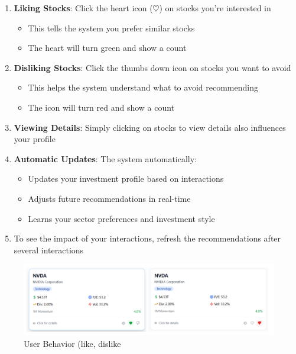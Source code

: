 \begin{enumerate}
    \item \textbf{Liking Stocks}: Click the heart icon ($\pmb{\heartsuit}$) on stocks you're interested in
    \begin{itemize}
        \item This tells the system you prefer similar stocks
        \item The heart will turn green and show a count
    \end{itemize}
    \item \textbf{Disliking Stocks}: Click the thumbs down icon on stocks you want to avoid
    \begin{itemize}
        \item This helps the system understand what to avoid recommending
        \item The icon will turn red and show a count
    \end{itemize}
    \item \textbf{Viewing Details}: Simply clicking on stocks to view details also influences your profile
    \item \textbf{Automatic Updates}: The system automatically:
    \begin{itemize}
        \item Updates your investment profile based on interactions
        \item Adjusts future recommendations in real-time
        \item Learns your sector preferences and investment style
    \end{itemize}
    \item To see the impact of your interactions, refresh the recommendations after several interactions
\end{enumerate}

\begin{figure}[H]
    \centering
    \includegraphics[width=1\linewidth]{images/stock_recommend/user_guide/like_dislike.png}
    \caption{User Behavior (like, dislike}
    \label{fig:like_dislike}
\end{figure}






